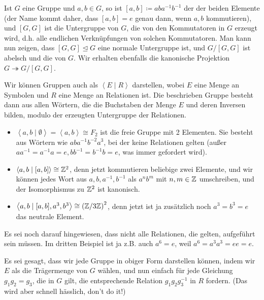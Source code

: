 \begin{recap}
    Ist $G$ eine Gruppe und  $a,b\in G$, so ist $[a,b] \coloneqq  aba^{-1}b^{-1}$ der  der beiden Elemente (der Name kommt daher, dass $[a,b] = e$ genau dann, wenn  $a,b$ kommutieren), und  $[G,G]$ ist die Untergruppe von  $G$, die von den Kommutatoren in $G$ erzeugt wird, d.h. alle endlichen Verknüpfungen von solchen Kommutatoren. Man kann nun zeigen, dass $[G,G]\unlhd G$ eine normale Untergruppe ist, und  $G / [G,G]$ ist abelsch und die   von $G$. Wir erhalten ebenfalls die kanonische Projektion $G \twoheadrightarrow G / [G,G]$.
\end{recap}

\begin{recap}
Wir können Gruppen auch als $\left< E \mid  R \right> $ darstellen, wobei $E$ eine Menge an Symbolen und  $R$ eine Menge an Relationen ist. Die beschrieben Gruppe besteht dann aus allen Wörtern, die die Buchstaben der Menge  $E$ und deren Inversen bilden, modulo der erzeugten Untergruppe der Relationen. \\
\begin{itemize}
    \item $\left< a,b \mid \emptyset \right>  = \left< a,b \right>  \cong F_2$ ist die freie Gruppe mit 2 Elementen. Sie besteht aus Wörtern wie $aba^{-1}b^{-2}a^3$, bei der keine Relationen gelten (außer $a a^{-1} = a^{-1}a = e, b b^{-1} = b^{-1} b = e$, was immer gefordert  wird).
    \item $\left< a,b \mid  [a,b] \right> \cong \mathbb{Z}^2$, denn jetzt kommutieren beliebige zwei Elemente, und wir können jedes Wort aus  $a,b,a^{-1},b^{-1}$ als $a^nb^m$ mit  $n,m \in \mathbb{Z}$ umschreiben, und der Isomorphismus zu $\mathbb{Z}^2$ ist kanonisch.
    \item $\left< a,b \mid  [a,b], a^3, b^3 \right> \cong \left( \mathbb{Z} / 3\mathbb{Z} \right) ^2$, denn jetzt ist ja zusätzlich noch $a^3 = b^3 = e$ das neutrale Element.
\end{itemize}
\end{recap}

\begin{oral}
\Warning    Es sei noch darauf hingewiesen, dass nicht alle Relationen, die gelten, aufgeführt sein müssen. Im dritten Beispiel ist ja z.B. auch $a^6 = e$, weil  $a^6 = a^3 a^3 = e e = e$.
\end{oral}
\begin{remark*}
Es sei gesagt, dass wir jede Gruppe in obiger Form darstellen können, indem wir $E$ als die Trägermenge von  $G$ wählen, und nun einfach für jede Gleichung  $g_1g_2 = g_3$, die in $G$ gilt, die entsprechende Relation  $g_1g_2g_3^{-1}$ in $R$ fordern. (Das wird aber schnell hässlich, don't do it!)
\end{remark*}

